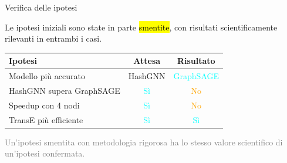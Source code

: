 \documentclass{beamer}
\begin{document}
\begin{frame}{Verifica delle ipotesi}

  Le ipotesi iniziali sono state in parte \hl{smentite},
  con risultati scientificamente rilevanti in entrambi i casi.

  \vspace{0.8em}

  \begin{center}
  \begin{tabular}{lcc}
    \toprule
    \textbf{Ipotesi} & \textbf{Attesa} & \textbf{Risultato} \\
    \midrule
    Modello più accurato
      & HashGNN
      & \textcolor{Cyan}{GraphSAGE} \\[6pt]
    HashGNN supera GraphSAGE
      & \textcolor{Cyan}{Sì}
      & \textcolor{Orange}{No} \\[6pt]
    Speedup con 4 nodi
      & \textcolor{Cyan}{Sì}
      & \textcolor{Orange}{No} \\[6pt]
    TransE più efficiente
      & \textcolor{Cyan}{Sì}
      & \textcolor{Cyan}{Sì} \\
    \bottomrule
  \end{tabular}
  \end{center}

  \vspace{0.8em}

  \begin{center}
    \small\textcolor{Gray}{Un'ipotesi smentita con metodologia rigorosa
    ha lo stesso valore scientifico di un'ipotesi confermata.}
  \end{center}

\end{frame}
\end{document}
